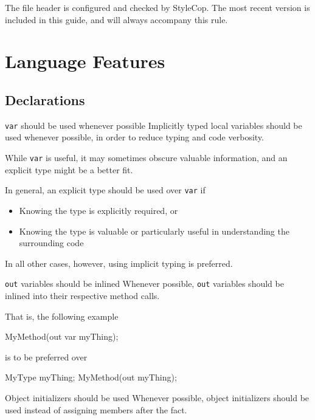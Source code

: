 \documentclass[11pt,a4paper]{article}
\newcounter{rule}[section]
\begin{document}
The file header is configured and checked by StyleCop. The most recent version is included in this guide, and will always accompany this rule.

\section{Language Features}
\subsection{Declarations}
\begin{should}{\texttt{var} should be used whenever possible}
Implicitly typed local variables should be used whenever possible, in order to reduce typing and code verbosity.
\end{should}

While \texttt{var} is useful, it may sometimes obscure valuable information, and an explicit type might be a better fit.

In general, an explicit type should be used over \texttt{var} if
\begin{itemize}
\item Knowing the type is explicitly required, or
\item Knowing the type is valuable or particularly useful in understanding the surrounding code
\end{itemize}

In all other cases, however, using implicit typing is preferred.

\begin{should}{\texttt{out} variables should be inlined}
Whenever possible, \texttt{out} variables should be inlined into their respective method calls.
\end{should}

That is, the following example 
\begin{code}
MyMethod(out var myThing);
\end{code}

is to be preferred over

\begin{code}
MyType myThing;
MyMethod(out myThing);
\end{code}

\begin{should}{Object initializers should be used}
Whenever possible, object initializers should be used instead of assigning members after the fact.
\end{should}
\end{document}
